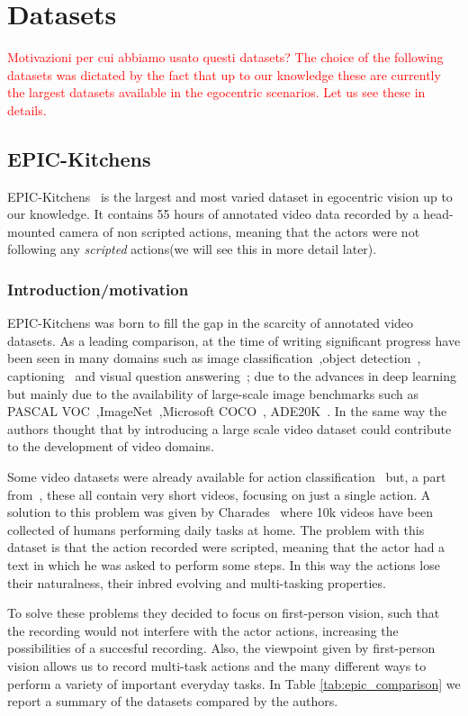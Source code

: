 \chapter{Datasets}
\textcolor{red}{Motivazioni per cui abbiamo usato questi datasets?
The choice of the following datasets was dictated by the fact that up to our knowledge these are 
currently the largest datasets available in the egocentric scenarios. Let us see these in details.}
\section{EPIC-Kitchens}
EPIC-Kitchens~\cite{EPICKITCHENS} is the largest and most varied dataset in egocentric vision up to our knowledge.
It contains 55 hours of annotated video data recorded by a head-mounted camera of non scripted actions, 
meaning that the actors were not following any \textit{scripted} actions(we will see this in more detail
later).
\subsection{Introduction/motivation}
EPIC-Kitchens was born to fill the gap in the scarcity of annotated video datasets.
As a leading comparison, at the time of writing significant progress have been seen in many domains
such as image classification~\cite{residualImage},object detection~\cite{fasterRCNN},
captioning~\cite{captioning} and visual question answering~\cite{vqa}; due to the advances in deep
learning but mainly due to the availability of large-scale image benchmarks 
such as PASCAL VOC~\cite{pascalImage},ImageNet~\cite{imagenet},Microsoft COCO~\cite{COCO},
ADE20K~\cite{ADE20K}. In the same way the authors thought that by introducing
a large scale video dataset could contribute to the development 
of video domains.

Some video datasets were already available for action classification~\cite{somethingSomething,yt,movieBench,movieQA,vlogs}
but, a part from~\cite{movieQA}, these all contain very short videos, focusing on just
a single action. A solution to this problem was given by Charades~\cite{charades} where 10k
videos have been collected of humans performing daily tasks at home.
The problem with this dataset is that the action recorded were scripted,
meaning that the actor had a text in which he was asked to perform some steps.
In this way the actions lose their naturalness, their inbred evolving 
and multi-tasking properties.

To solve these problems they decided to focus on first-person vision, such that
the recording would not interfere with the actor actions, increasing the 
possibilities of a succesful recording. Also, the viewpoint given by 
first-person vision allows us to record multi-task actions and the many different
ways to perform a variety of important everyday tasks. In Table \ref{tab:epic_comparison}
we report a summary of the datasets compared by the authors.

